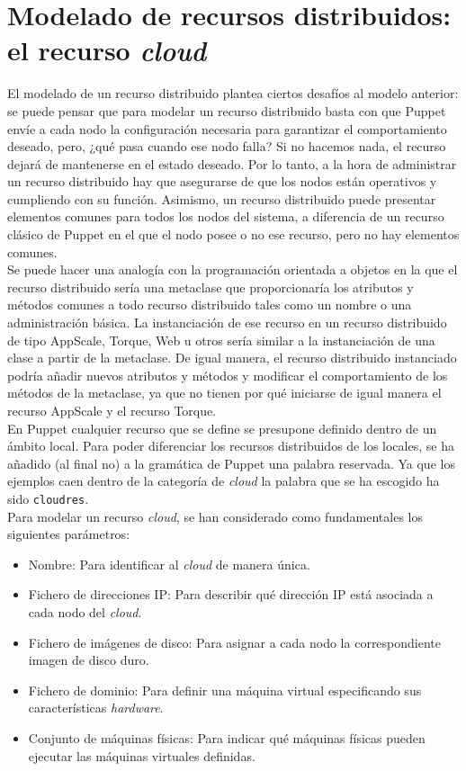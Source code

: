 \section{Modelado de recursos distribuidos: el recurso \emph{cloud}}

El modelado de un recurso distribuido plantea ciertos desafíos al modelo anterior: se puede pensar que para modelar un recurso distribuido basta con que Puppet envíe a cada nodo la configuración necesaria para garantizar el comportamiento deseado, pero, ¿qué pasa cuando ese nodo falla? Si no hacemos nada, el recurso dejará de mantenerse en el estado deseado. Por lo tanto, a la hora de administrar un recurso distribuido hay que asegurarse de que los nodos están operativos y cumpliendo con su función. Asimismo, un recurso distribuido puede presentar elementos comunes para todos los nodos del sistema, a diferencia de un recurso clásico de Puppet en el que el nodo posee o no ese recurso, pero no hay elementos comunes.\\

Se puede hacer una analogía con la programación orientada a objetos en la que el recurso distribuido sería una metaclase que proporcionaría los atributos y métodos comunes a todo recurso distribuido tales como un nombre o una administración básica. La instanciación de ese recurso en un recurso distribuido de tipo AppScale, Torque, Web u otros sería similar a la instanciación de una clase a partir de la metaclase. De igual manera, el recurso distribuido instanciado podría añadir nuevos atributos y métodos y modificar el comportamiento de los métodos de la metaclase, ya que no tienen por qué iniciarse de igual manera el recurso AppScale y el recurso Torque.\\

En Puppet cualquier recurso que se define se presupone definido dentro de un ámbito local. Para poder diferenciar los recursos distribuidos de los locales, se ha añadido (al final no) a la gramática de Puppet una palabra reservada. Ya que los ejemplos caen dentro de la categoría de \emph{cloud} la palabra que se ha escogido ha sido \texttt{cloudres}.\\

Para modelar un recurso \emph{cloud}, se han considerado como fundamentales los siguientes parámetros:
\begin{itemize}
\item Nombre: Para identificar al \emph{cloud} de manera única.
\item Fichero de direcciones IP: Para describir qué dirección IP está asociada a cada nodo del \emph{cloud}.
\item Fichero de imágenes de disco: Para asignar a cada nodo la correspondiente imagen de disco duro.
\item Fichero de dominio: Para definir una máquina virtual especificando sus características \emph{hardware}.
\item Conjunto de máquinas físicas: Para indicar qué máquinas físicas pueden ejecutar las máquinas virtuales definidas.
\end{itemize}

